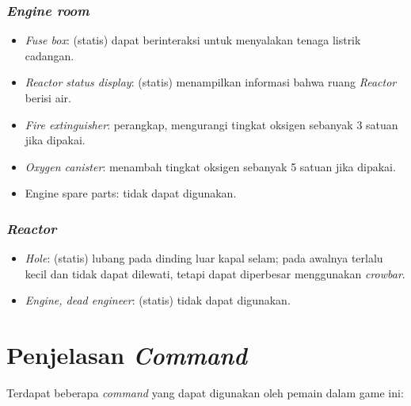 \documentclass[a4paper,titlepage]{article}
\begin{document}
			\subsubsection{\textit{Engine room}}
			\begin{itemize}
				\item \textit{Fuse box}: (statis) dapat berinteraksi untuk menyalakan tenaga listrik cadangan.
				\item \textit{Reactor status display}: (statis) menampilkan informasi bahwa ruang \textit{Reactor} berisi air.
				\item \textit{Fire extinguisher}: perangkap, mengurangi tingkat oksigen sebanyak 3 satuan jika dipakai.
				\item \textit{Oxygen canister}: menambah tingkat oksigen sebanyak 5 satuan jika dipakai.
				\item{Engine spare parts}: tidak dapat digunakan.
			\end{itemize}

			\subsubsection{\textit{Reactor}}
			\begin{itemize}
				\item \textit{Hole}: (statis) lubang pada dinding luar kapal selam; pada awalnya terlalu kecil dan tidak dapat dilewati, tetapi dapat diperbesar menggunakan \textit{crowbar}.
				\item \textit{Engine, dead engineer}: (statis) tidak dapat digunakan.
			\end{itemize}

	\section{Penjelasan \textit{Command}}

		\noindent Terdapat beberapa \textit{command} yang dapat digunakan oleh pemain dalam game ini:
\end{document}
